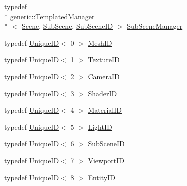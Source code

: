 \begin{DoxyCompactItemize}
\item 
typedef \\*
\hyperlink{classkglt_1_1generic_1_1_templated_manager}{generic\-::\-Templated\-Manager}\\*
$<$ \hyperlink{classkglt_1_1_scene}{Scene}, \hyperlink{classkglt_1_1_sub_scene}{Sub\-Scene}, \hyperlink{namespacekglt_a36b738e02745f47c81d1c9991fdc6237}{Sub\-Scene\-I\-D} $>$ \hyperlink{namespacekglt_a8531aaaf2d2242f192637125e1c40e5e}{Sub\-Scene\-Manager}
\item 
typedef \hyperlink{class_unique_i_d}{Unique\-I\-D}$<$ 0 $>$ \hyperlink{namespacekglt_a525b047f668a129a0b102be7f2fe32be}{Mesh\-I\-D}
\item 
typedef \hyperlink{class_unique_i_d}{Unique\-I\-D}$<$ 1 $>$ \hyperlink{namespacekglt_aaea040f25edb7f75ca0f3aa8136a45a1}{Texture\-I\-D}
\item 
typedef \hyperlink{class_unique_i_d}{Unique\-I\-D}$<$ 2 $>$ \hyperlink{namespacekglt_a2a2b79f136b052b58ec737bd9c885429}{Camera\-I\-D}
\item 
typedef \hyperlink{class_unique_i_d}{Unique\-I\-D}$<$ 3 $>$ \hyperlink{namespacekglt_a2aafe4bf33d26659020117cad360422f}{Shader\-I\-D}
\item 
typedef \hyperlink{class_unique_i_d}{Unique\-I\-D}$<$ 4 $>$ \hyperlink{namespacekglt_a5ffac6377a7d3e163b4d5c31f71db43a}{Material\-I\-D}
\item 
typedef \hyperlink{class_unique_i_d}{Unique\-I\-D}$<$ 5 $>$ \hyperlink{namespacekglt_ab90464803ef8e3c1f6da41388e859968}{Light\-I\-D}
\item 
typedef \hyperlink{class_unique_i_d}{Unique\-I\-D}$<$ 6 $>$ \hyperlink{namespacekglt_a36b738e02745f47c81d1c9991fdc6237}{Sub\-Scene\-I\-D}
\item 
typedef \hyperlink{class_unique_i_d}{Unique\-I\-D}$<$ 7 $>$ \hyperlink{namespacekglt_a24d24e429365d0832e56b0082d8e53a0}{Viewport\-I\-D}
\item 
typedef \hyperlink{class_unique_i_d}{Unique\-I\-D}$<$ 8 $>$ \hyperlink{namespacekglt_a693458ae13c224ae3ea4074ac3a0b02a}{Entity\-I\-D}
\end{DoxyCompactItemize}
